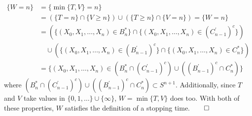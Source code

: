 \documentclass[11pt, letterpaper]{article}
\begin{document}
    \begin{align*}
        \{W=n\}&=\{\min\{T,V\}=n\}\\
        &=(\{T=n\}\cap\{V\geq n\})\cup(\{T\geq n\}\cap\{V=n\})=\{W=n\}\\
        &=(\{(X_0,X_1,\dots,X_n)\in B_n^\ast\}\cap\{(X_0,X_1,\dots,X_n)\in(C_{n-1}^\prime)^c\})\\
        &\quad\cup(\{(X_0,X_1,\dots,X_n)\in (B_{n-1}^\prime)^c\}\cap\{(X_0,X_1,\dots,X_n)\in C_n^\ast\})\\
        &=\{(X_0,X_1,\dots,X_n)\in(B_n^\ast\cap(C_{n-1}^\prime)^c)\cup((B_{n-1}^\prime)^c\cap C_n^\ast)\}
    \end{align*}
    where $(B_n^\ast\cap(C_{n-1}^\prime)^c)\cup((B_{n-1}^\prime)^c\cap C_n^\ast)\subset S^{n+1}$. Additionally, since $T$ and $V$ take values in $\{0,1,\dots\}\cup\{\infty\}$, $W=\min\{T,V\}$ does too. With both of these properties, $W$ satisfies the definition of a stopping time.\hfill{$\qed$}
\end{document}
